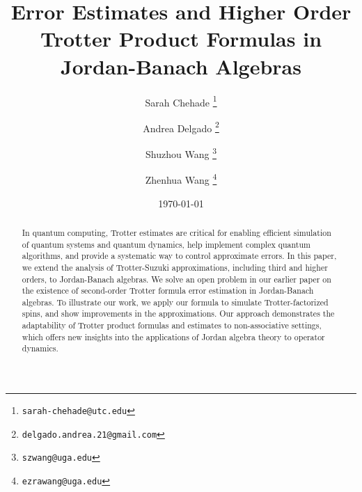 \documentclass{article}
\theoremstyle{plain} %
\numberwithin{equation}{section}
\begin{document}
\title{Error Estimates and Higher Order Trotter Product Formulas in Jordan-Banach Algebras}





\author[1, 2]{Sarah Chehade \thanks{\texttt{sarah-chehade@utc.edu}}}
\author[3]{Andrea Delgado \thanks{\texttt{delgado.andrea.21@gmail.com}}}
\author[4]{Shuzhou Wang \thanks{\texttt{szwang@uga.edu}}}
\author[4, 5]{Zhenhua Wang \thanks{\texttt{ezrawang@uga.edu}}}


\date{\today}
\maketitle

\begin{abstract}
     In quantum computing, Trotter estimates are critical for enabling efficient simulation of quantum systems and quantum dynamics, help implement complex quantum algorithms, and provide a systematic way to control approximate errors. 
In this paper, we extend the analysis of Trotter-Suzuki approximations, including third and higher orders, to Jordan-Banach algebras. We solve an open problem in our earlier paper on the existence of second-order Trotter formula error estimation in Jordan-Banach algebras. To illustrate our work, we apply our formula to simulate Trotter-factorized spins, and show improvements in the approximations. Our approach demonstrates the adaptability of Trotter product formulas and estimates to non-associative settings, which offers new insights into the applications of Jordan algebra theory to operator dynamics. 

\end{abstract}
\end{document}
